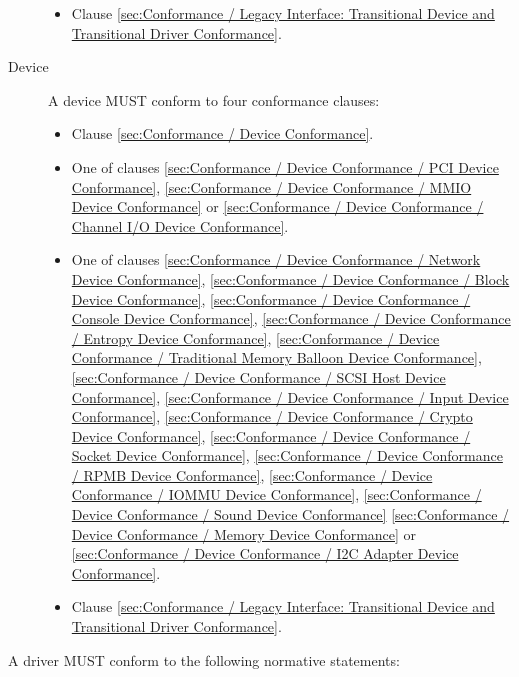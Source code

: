 \begin{description}
\begin{itemize}
    \item Clause \ref{sec:Conformance / Legacy Interface: Transitional Device and Transitional Driver Conformance}.
  \end{itemize}
\item[Device] A device MUST conform to four conformance clauses:
  \begin{itemize}
    \item Clause \ref{sec:Conformance / Device Conformance}.
    \item One of clauses \ref{sec:Conformance / Device Conformance / PCI Device Conformance}, \ref{sec:Conformance / Device Conformance / MMIO Device Conformance} or \ref{sec:Conformance / Device Conformance / Channel I/O Device Conformance}.
    \item One of clauses 
\ref{sec:Conformance / Device Conformance / Network Device Conformance}, 
\ref{sec:Conformance / Device Conformance / Block Device Conformance}, 
\ref{sec:Conformance / Device Conformance / Console Device Conformance}, 
\ref{sec:Conformance / Device Conformance / Entropy Device Conformance}, 
\ref{sec:Conformance / Device Conformance / Traditional Memory Balloon Device Conformance}, 
\ref{sec:Conformance / Device Conformance / SCSI Host Device Conformance}, 
\ref{sec:Conformance / Device Conformance / Input Device Conformance}, 
\ref{sec:Conformance / Device Conformance / Crypto Device Conformance}, 
\ref{sec:Conformance / Device Conformance / Socket Device Conformance}, 
\ref{sec:Conformance / Device Conformance / RPMB Device Conformance},
\ref{sec:Conformance / Device Conformance / IOMMU Device Conformance},
\ref{sec:Conformance / Device Conformance / Sound Device Conformance}
\ref{sec:Conformance / Device Conformance / Memory Device Conformance} or
\ref{sec:Conformance / Device Conformance / I2C Adapter Device Conformance}.

    \item Clause \ref{sec:Conformance / Legacy Interface: Transitional Device and Transitional Driver Conformance}.
  \end{itemize}
\end{description}

\label{sec:Conformance / Driver Conformance}

A driver MUST conform to the following normative statements:

